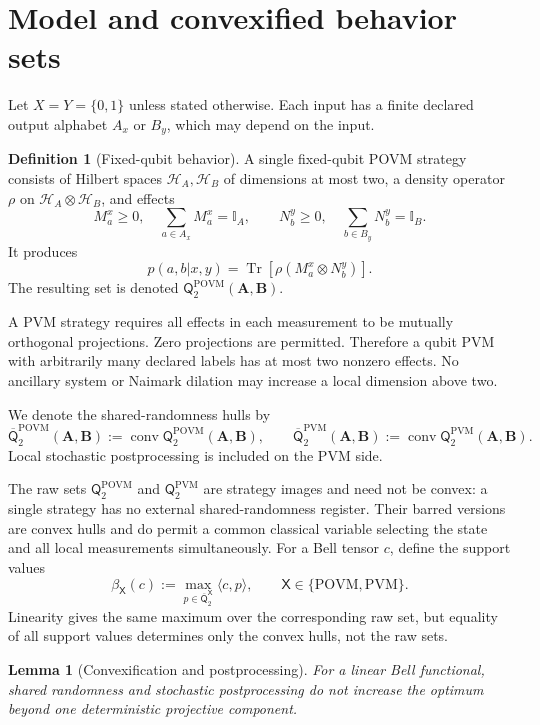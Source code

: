\documentclass[11pt]{article}
\newtheorem{lemma}[theorem]{Lemma}
\theoremstyle{definition}
\newtheorem{definition}[theorem]{Definition}
\newcommand{\Tr}{\operatorname{Tr}}
\newcommand{\conv}{\operatorname{conv}}
\newcommand{\id}{\mathbb I}
\newcommand{\Qset}{\mathsf Q}
\newcommand{\Qbar}{\overline{\mathsf Q}}
\newcommand{\POVM}{\mathrm{POVM}}
\newcommand{\PVM}{\mathrm{PVM}}
\begin{document}
\section{Model and convexified behavior sets}
\label{sec:model}

Let \(X=Y=\{0,1\}\) unless stated otherwise. Each input has a finite declared
output alphabet \(A_x\) or \(B_y\), which may depend on the input.

\begin{definition}[Fixed-qubit behavior]
A single fixed-qubit POVM strategy consists of Hilbert spaces
\(\mathcal H_A,\mathcal H_B\) of dimensions at most two, a density operator
\(\rho\) on \(\mathcal H_A\otimes\mathcal H_B\), and effects
\[
 M^x_a\ge0,\quad \sum_{a\in A_x}M^x_a=\id_A,\qquad
 N^y_b\ge0,\quad \sum_{b\in B_y}N^y_b=\id_B.
\]
It produces
\[
 p(a,b|x,y)=\Tr\!\left[\rho(M^x_a\otimes N^y_b)\right].
\]
The resulting set is denoted
\(\Qset^{\POVM}_2(\mathbf A,\mathbf B)\).
\end{definition}

A PVM strategy requires all effects in each measurement to be mutually
orthogonal projections. Zero projections are permitted. Therefore a
qubit PVM with arbitrarily many declared labels has at most two nonzero
effects. No ancillary system or Naimark dilation may increase a local
dimension above two.

We denote the shared-randomness hulls by
\[
\Qbar^{\POVM}_2(\mathbf A,\mathbf B)
 :=\conv\Qset^{\POVM}_2(\mathbf A,\mathbf B),\qquad
\Qbar^{\PVM}_2(\mathbf A,\mathbf B)
 :=\conv\Qset^{\PVM}_2(\mathbf A,\mathbf B).
\]
Local stochastic postprocessing is included on the PVM side.

The raw sets \(\Qset^{\POVM}_2\) and \(\Qset^{\PVM}_2\) are strategy images
and need not be convex: a single strategy has no external shared-randomness
register. Their barred versions are convex hulls and do permit a common
classical variable selecting the state and all local measurements
simultaneously. For a Bell tensor \(c\), define the support values
\[
\beta_{\mathsf X}(c)
:=\max_{p\in\Qbar^{\mathsf X}_2}\langle c,p\rangle,
\qquad \mathsf X\in\{\POVM,\PVM\}.
\]
Linearity gives the same maximum over the corresponding raw set, but equality
of all support values determines only the convex hulls, not the raw sets.

\begin{lemma}[Convexification and postprocessing]
\label{lem:convexification}
For a linear Bell functional, shared randomness and stochastic
postprocessing do not increase the optimum beyond one deterministic
projective component.
\end{lemma}
\end{document}
